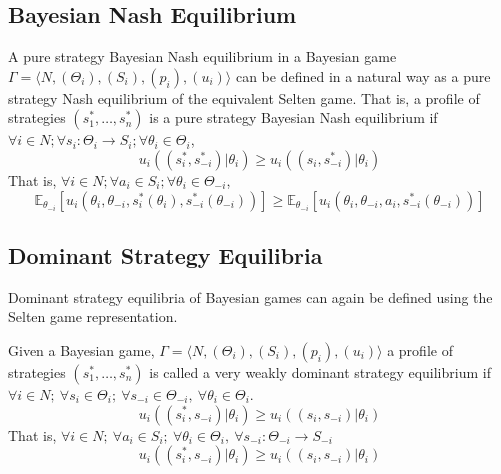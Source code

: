 \subsection{Bayesian Nash Equilibrium}
\begin{defn}
    A pure strategy Bayesian Nash equilibrium in a Bayesian game $\Gamma = \langle N,(\Theta_i),(S_i),(p_i),(u_i)\rangle$ can be defined in a natural way as a pure strategy Nash equilibrium of the equivalent Selten game.
    That is, a profile of strategies $(s_1^*,\ldots,s_n^*)$ is a pure strategy Bayesian Nash equilibrium if $\forall i \in N; \forall s_i : \Theta_i \rightarrow S_i; \forall \theta_i \in \Theta_i$,
    \[u_{i}((s_i^*,s_{-i}^*)|\theta_i)\geq u_{i}((s_i,s_{-i}^*)|\theta_i)\]
    That is, $\forall i\in N; \forall a_i\in S_i; \forall \theta_i\in \Theta_{-i}$,
    \[\mathbb{E}_{\theta_{-i}}[u_{i}(\theta_i,\theta_{-i},s_i^*(\theta_i),s_{-i}^*(\theta_{-i}))]\geq\mathbb{E}_{\theta_{-i}}[u_{i}(\theta_i,\theta_{-i},a_i,s_{-i}^*(\theta_{-i}))]\]
\end{defn}
\subsection{Dominant Strategy Equilibria}
Dominant strategy equilibria of Bayesian games can again be defined using the Selten game representation.
\begin{defn}
    Given a Bayesian game, $\Gamma = \langle N,(\Theta_i),(S_i),(p_i),(u_i)\rangle$ a profile of strategies $(s_1^*,\ldots,s_n^*)$ is called a very weakly dominant strategy equilibrium if $\forall i\in N;\ \forall s_i\in \Theta_i;\ \forall s_{-i}\in \Theta_{-i},\ \forall \theta_i\in \Theta_i$.
    \[u_{i}((s_i^*,s_{-i})|\theta_i)\geq u_{i}((s_i,s_{-i})|\theta_i)\]
    That is, $\forall i\in N;\ \forall a_i\in S_i;\ \forall \theta_i\in \Theta_{i},\ \forall s_{-i}:\Theta_{-i}\rightarrow S_{-i}$
    \[u_{i}((s_i^*,s_{-i})|\theta_i)\geq u_{i}((s_i,s_{-i})|\theta_i)\]
\end{defn}